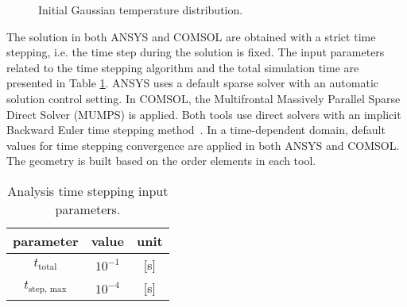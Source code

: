 \begin{figure}[H]
\centering
    \caption{Initial Gaussian temperature distribution.}
    \label{fig: init_gauss_temp_distr}
\end{figure}

The solution in both ANSYS and COMSOL are obtained with a strict time stepping, i.e. the time step during the solution is fixed. The input parameters related to the time stepping algorithm and the total simulation time are presented in Table \ref{table: 1d_quench_propagation_analysis_time_stepping_input_parameters}. ANSYS uses a default sparse solver with an automatic solution control setting. In COMSOL, the Multifrontal Massively Parallel Sparse Direct Solver (MUMPS) is applied. Both tools use direct solvers with an implicit Backward Euler time stepping method~\cite{comsol_webpage, ansys_command_reference}. In a time-dependent domain, default values for time stepping convergence are applied in both ANSYS and COMSOL. The geometry is built based on the  order elements in each tool.

\begin{table}[H]
    \caption{Analysis time stepping input parameters.} 
    \vspace{-1.em} 
    \fontsize{10}{10}
    \selectfont 
    \renewcommand{\arraystretch}{1.5}
    \begin{center}
        \begin{tabular}{ ccc }  
        \hline
        parameter & value & unit \\
        \hline
        $t_\text{total}$ & $10^{-1}$ & [s] \\   
        $t_\text{step, max}$ & $10^{-4}$ & [s] \\   
        \hline 
        \end{tabular}
    \end{center}  
     \label{table: 1d_quench_propagation_analysis_time_stepping_input_parameters} 
 \end{table}

